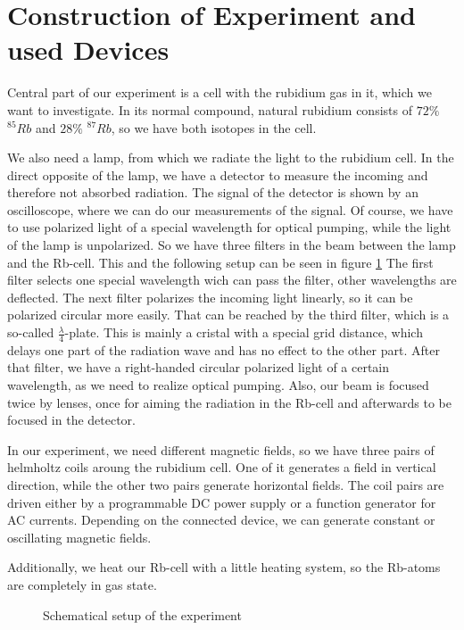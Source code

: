 \section{Construction of Experiment and used Devices}
Central part of our experiment is a cell with the rubidium gas in it, which we want to investigate. In its normal compound, natural rubidium consists of $72\%$ $^{85}Rb$ and $28\%$ $ ^{87}Rb$, so we have both isotopes in the cell.

We also need a lamp, from which we radiate the light to the rubidium cell. In the direct opposite of the lamp, we have a detector to measure the incoming and therefore not absorbed radiation. The signal of the detector is shown by an oscilloscope, where we can do our measurements of the signal. Of course, we have to use polarized light of a special wavelength for optical pumping, while the light of the lamp is unpolarized. So we have three filters in the beam between the lamp and the Rb-cell. This and the following setup can be seen in figure \ref{setup} The first filter selects one special wavelength wich can pass the filter, other wavelengths are deflected. The next filter polarizes the incoming light linearly, so it can be polarized circular more easily. That can be reached by the third filter, which is a so-called $\frac{\lambda}{4}$-plate. This is mainly a cristal with a special grid distance, which delays one part of the radiation wave and has no effect to the other part. After that filter, we have a right-handed circular polarized light of a certain wavelength, as we need to realize optical pumping. Also, our beam is focused twice by lenses, once for aiming the radiation in the Rb-cell and afterwards to be focused in the detector. 

In our experiment, we need different magnetic fields, so we have three pairs of helmholtz coils aroung the rubidium cell. One of it generates a field in vertical direction, while the other two pairs generate horizontal fields. The coil pairs are driven  either by a programmable DC power supply or a function generator for AC currents. Depending on the connected device, we can generate constant or oscillating magnetic fields. 

Additionally, we heat our Rb-cell with a little heating system, so the Rb-atoms are completely in gas state. 

\begin{figure}[htbp] 
     
  \caption{Schematical setup of the experiment}
  \label{setup}
\end{figure}
